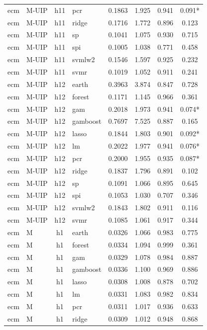 \begin{ThreePartTable}
\begin{longtable}[t]{llclcccc}
ecm & M-UIP & h11 & pcr & 0.1863 & 1.925 & 0.941 & 0.091*\\
ecm & M-UIP & h11 & ridge & 0.1716 & 1.772 & 0.896 & 0.123\\
ecm & M-UIP & h11 & sp & 0.1041 & 1.075 & 0.930 & 0.715\\
ecm & M-UIP & h11 & spi & 0.1005 & 1.038 & 0.771 & 0.458\\
ecm & M-UIP & h11 & svmlw2 & 0.1546 & 1.597 & 0.925 & 0.232\\
ecm & M-UIP & h11 & svmr & 0.1019 & 1.052 & 0.911 & 0.241\\
\addlinespace
ecm & M-UIP & h12 & earth & 0.3963 & 3.874 & 0.847 & 0.728\\
ecm & M-UIP & h12 & forest & 0.1171 & 1.145 & 0.966 & 0.361\\
ecm & M-UIP & h12 & gam & 0.2018 & 1.973 & 0.941 & 0.074*\\
ecm & M-UIP & h12 & gamboost & 0.7697 & 7.525 & 0.887 & 0.165\\
ecm & M-UIP & h12 & lasso & 0.1844 & 1.803 & 0.901 & 0.092*\\
ecm & M-UIP & h12 & lm & 0.2022 & 1.977 & 0.941 & 0.076*\\
ecm & M-UIP & h12 & pcr & 0.2000 & 1.955 & 0.935 & 0.087*\\
ecm & M-UIP & h12 & ridge & 0.1837 & 1.796 & 0.891 & 0.102\\
ecm & M-UIP & h12 & sp & 0.1091 & 1.066 & 0.895 & 0.645\\
ecm & M-UIP & h12 & spi & 0.1053 & 1.030 & 0.707 & 0.346\\
ecm & M-UIP & h12 & svmlw2 & 0.1843 & 1.802 & 0.911 & 0.116\\
ecm & M-UIP & h12 & svmr & 0.1085 & 1.061 & 0.917 & 0.344\\
\addlinespace
ecm & M & h1 & earth & 0.0326 & 1.066 & 0.983 & 0.775\\
ecm & M & h1 & forest & 0.0334 & 1.094 & 0.999 & 0.361\\
ecm & M & h1 & gam & 0.0329 & 1.078 & 0.984 & 0.887\\
ecm & M & h1 & gamboost & 0.0336 & 1.100 & 0.969 & 0.886\\
ecm & M & h1 & lasso & 0.0308 & 1.008 & 0.878 & 0.702\\
ecm & M & h1 & lm & 0.0331 & 1.083 & 0.982 & 0.834\\
ecm & M & h1 & pcr & 0.0311 & 1.017 & 0.936 & 0.633\\
ecm & M & h1 & ridge & 0.0309 & 1.012 & 0.948 & 0.868\\

\end{longtable}
\end{ThreePartTable}
